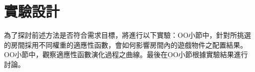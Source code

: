 \renewcommand\thetable{\arabic{chapter}-\arabic{table}}
\chapter{實驗設計}

為了探討前述方法是否符合需求目標，將進行以下實驗：OO小節中，針對所挑選的房間採用不同權重的適應性函數，會如何影響房間內的遊戲物件之配置結果。OO小節中，觀察適應性函數演化過程之曲線。最後在OO小節根據實驗結果進行討論。